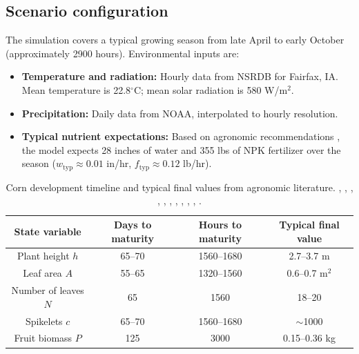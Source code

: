 \documentclass[preprint,12pt]{elsarticle}
\begin{document}
\subsection{Scenario configuration}\label{subsec:scenario}

The simulation covers a typical growing season from late April to early October (approximately 2900 hours). Environmental inputs are:

\begin{itemize}
\item \textbf{Temperature and radiation:} Hourly data from NSRDB for Fairfax, IA. Mean temperature is 22.8$^{\circ}$C; mean solar radiation is 580 W/m$^{2}$.
\item \textbf{Precipitation:} Daily data from NOAA, interpolated to hourly resolution.
\item \textbf{Typical nutrient expectations:} Based on agronomic recommendations \cite{corn-nutrient-management}, the model expects 28 inches of water and 355 lbs of NPK fertilizer over the season ($w_{\text{typ}} \approx 0.01$ in/hr, $f_{\text{typ}} \approx 0.12$ lb/hr).
\end{itemize}

\begin{table}[ht]
\centering
\begin{tabular}{|c|c|c|c|}
\hline
State variable       & Days to maturity & Hours to maturity & Typical final value \\
\hline\hline
Plant height $h$     & 65--70           & 1560--1680        & 2.7--3.7 m          \\
Leaf area $A$        & 55--65           & 1320--1560        & 0.6--0.7 m$^{2}$    \\
Number of leaves $N$ & 65               & 1560              & 18--20              \\
Spikelets $c$        & 65--70           & 1560--1680        & $\sim$1000          \\
Fruit biomass $P$    & 125              & 3000              & 0.15--0.36 kg       \\
\hline
\end{tabular}
\caption{Corn development timeline and typical final values from agronomic literature. \cite{corn-growth-stages,corn-physiology}, \cite{bayer2018height_difference_corn}, \cite{kellersfarmstand2018sweetcorn_fieldcorn_height}, \cite{nanda2017corn_leaf_number_maturity}, \cite{nielsen2025tassel_emergence_pollen_shed}, \cite{ufseeds2024pencil_cob_corn_seed}, \cite{bayer2020corn_growth_stages_gdu}, \cite{ucdavis2024corn_crop_development}, \cite{sisson2020corn_growth_stages}, \cite{westco_corn_growth}, \cite{cornstates2018corn_growth_stages_gdu}.}
\label{tab:corn-development}
\end{table}
\end{document}
